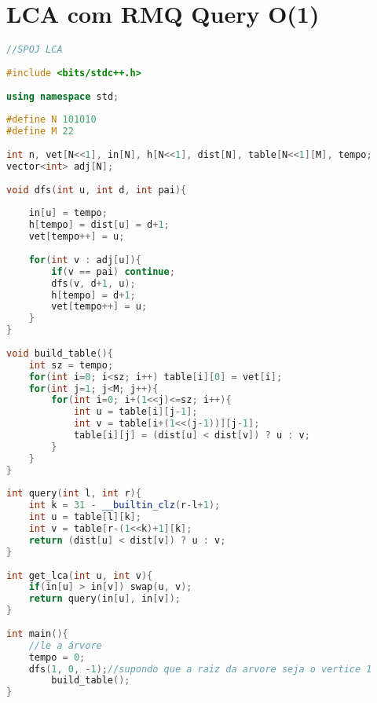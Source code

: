 \documentclass[12pt,a4paper,twoside]{report}
\begin{document}
\section{LCA com RMQ Query O(1)}
\noindent\begin{lstlisting}[caption=LCA com RMQ Query O(1),language=C++]
//SPOJ LCA
 
#include <bits/stdc++.h>
 
using namespace std;
 
#define N 101010
#define M 22
 
int n, vet[N<<1], in[N], h[N<<1], dist[N], table[N<<1][M], tempo;
vector<int> adj[N];
 
void dfs(int u, int d, int pai){
     
    in[u] = tempo;
    h[tempo] = dist[u] = d+1;
    vet[tempo++] = u;
     
    for(int v : adj[u]){
        if(v == pai) continue;
        dfs(v, d+1, u);
        h[tempo] = d+1;
        vet[tempo++] = u;
    }
}
 
void build_table(){
    int sz = tempo;
    for(int i=0; i<sz; i++) table[i][0] = vet[i];
    for(int j=1; j<M; j++){
        for(int i=0; i+(1<<j)<=sz; i++){
            int u = table[i][j-1];
            int v = table[i+(1<<(j-1))][j-1];
            table[i][j] = (dist[u] < dist[v]) ? u : v;
        }
    }
}
 
int query(int l, int r){
    int k = 31 - __builtin_clz(r-l+1);
    int u = table[l][k];
    int v = table[r-(1<<k)+1][k];
    return (dist[u] < dist[v]) ? u : v;
}
 
int get_lca(int u, int v){
    if(in[u] > in[v]) swap(u, v);
    return query(in[u], in[v]);
}
 
int main(){
    //le a árvore
    tempo = 0;
    dfs(1, 0, -1);//supondo que a raiz da arvore seja o vertice 1
        build_table();    
}
\end{lstlisting}
\end{document}

